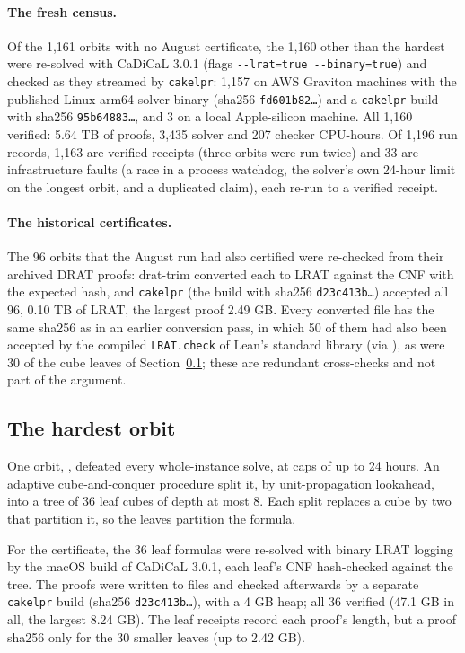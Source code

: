 \documentclass{anvil-paper}
\newcommand{\repobase}{https://github.com/rjwalters/lean-genius/blob/erdos85/integration}
\newcommand{\repofile}[2]{\href{\repobase/#1}{\lean{#2}}}
\newcommand{\cakelpr}{\texttt{cake\textunderscore lpr}}
\newcommand{\lratcheck}{\texttt{LRAT.check}}
\theoremstyle{definition}
\begin{document}
\paragraph{The fresh census.} Of the 1,161 orbits with no August certificate, the 1,160 other than the hardest were re-solved with CaDiCaL 3.0.1 (flags \texttt{-{}-lrat=true -{}-binary=true}) and checked as they streamed by \cakelpr{}: 1,157 on AWS Graviton machines with the published Linux arm64 solver binary (sha256 \texttt{fd601b82\ldots}) and a \cakelpr{} build with sha256 \texttt{95b64883\ldots}, and 3 on a local Apple-silicon machine. All 1,160 verified: 5.64 TB of proofs, 3,435 solver and 207 checker CPU-hours. Of 1,196 run records, 1,163 are verified receipts (three orbits were run twice) and 33 are infrastructure faults (a race in a process watchdog, the solver's own 24-hour limit on the longest orbit, and a duplicated claim), each re-run to a verified receipt.

\paragraph{The historical certificates.} The 96 orbits that the August run had also certified were re-checked from their archived DRAT proofs: drat-trim converted each to LRAT against the CNF with the expected hash, and \cakelpr{} (the build with sha256 \texttt{d23c413b\ldots}) accepted all 96, 0.10 TB of LRAT, the largest proof 2.49 GB. Every converted file has the same sha256 as in an earlier conversion pass, in which 50 of them had also been accepted by the compiled \lratcheck{} of Lean's standard library (via \repofile{proofs/Proofs/Erdos85LratRuntime.lean}{Erdos85LratRuntime.lean}), as were 30 of the cube leaves of Section~\ref{sec:cube}; these are redundant cross-checks and not part of the argument.

\subsection{The hardest orbit}\label{sec:cube}

One orbit, , defeated every whole-instance solve, at caps of up to 24 hours. An adaptive cube-and-conquer procedure split it, by unit-propagation lookahead, into a tree of 36 leaf cubes of depth at most 8. Each split replaces a cube by two that partition it, so the leaves partition the formula.

For the certificate, the 36 leaf formulas were re-solved with binary LRAT logging by the macOS build of CaDiCaL 3.0.1, each leaf's CNF hash-checked against the tree. The proofs were written to files and checked afterwards by a separate \cakelpr{} build (sha256 \texttt{d23c413b\ldots}), with a 4 GB heap; all 36 verified (47.1 GB in all, the largest 8.24 GB). The leaf receipts record each proof's length, but a proof sha256 only for the 30 smaller leaves (up to 2.42 GB).
\end{document}
